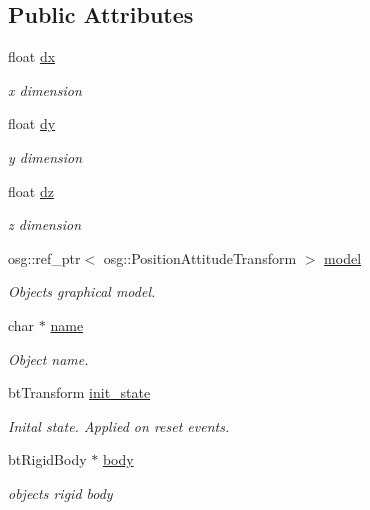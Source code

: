 \subsection*{Public Attributes}
\begin{DoxyCompactItemize}
\item 
float \hyperlink{classbtosgBox_a1d1e4744d9e377e1462ea097dacef716}{dx}
\begin{DoxyCompactList}\small\item\em x dimension \end{DoxyCompactList}\item 
float \hyperlink{classbtosgBox_a7665337187adb52a1ce3b4cf2819217d}{dy}
\begin{DoxyCompactList}\small\item\em y dimension \end{DoxyCompactList}\item 
float \hyperlink{classbtosgBox_a1dd905f6afb684d5d364f2b211dbab97}{dz}
\begin{DoxyCompactList}\small\item\em z dimension \end{DoxyCompactList}\item 
osg\+::ref\+\_\+ptr$<$ osg\+::\+Position\+Attitude\+Transform $>$ \hyperlink{classbtosgObject_afd15726e7a214212d6d5815f8ac1ac6c}{model}
\begin{DoxyCompactList}\small\item\em Object\textquotesingle{}s graphical model. \end{DoxyCompactList}\item 
char $\ast$ \hyperlink{classbtosgObject_a12396e1362797a75473a2e833b579cc9}{name}
\begin{DoxyCompactList}\small\item\em Object name. \end{DoxyCompactList}\item 
bt\+Transform \hyperlink{classbtosgObject_a2dee023f311114e200df9b04c8c1b400}{init\+\_\+state}
\begin{DoxyCompactList}\small\item\em Inital state. Applied on reset events. \end{DoxyCompactList}\item 
bt\+Rigid\+Body $\ast$ \hyperlink{classbtosgObject_a64ccde0543c184ed1749fdb9c9699785}{body}
\begin{DoxyCompactList}\small\item\em object\textquotesingle{}s rigid body \end{DoxyCompactList}\item 

\end{DoxyCompactItemize}
